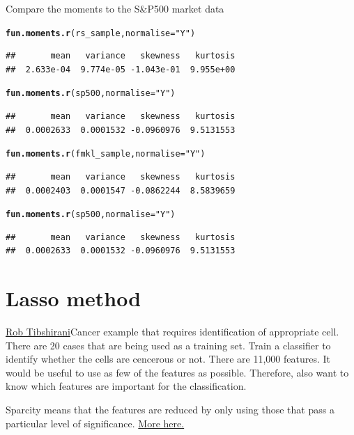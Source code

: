 \documentclass[12pt, a4paper, oneside]{article}\usepackage[]{graphicx}\usepackage[]{color}
\makeatletter
\newcommand{\hlstr}[1]{\textcolor[rgb]{0.192,0.494,0.8}{#1}}%
\newcommand{\hlstd}[1]{\textcolor[rgb]{0.345,0.345,0.345}{#1}}%
\newcommand{\hlkwc}[1]{\textcolor[rgb]{0.333,0.667,0.333}{#1}}%
\newcommand{\hlkwd}[1]{\textcolor[rgb]{0.737,0.353,0.396}{\textbf{#1}}}%
\newenvironment{kframe}{%
 \def\at@end@of@kframe{}%
 \ifinner\ifhmode%
  \def\at@end@of@kframe{\end{minipage}}%
  \begin{minipage}{\columnwidth}%
 \fi\fi%
 \def\FrameCommand##1{\hskip\@totalleftmargin \hskip-\fboxsep
 \colorbox{shadecolor}{##1}\hskip-\fboxsep
     \hskip-\linewidth \hskip-\@totalleftmargin \hskip\columnwidth}%
 \MakeFramed {\advance\hsize-\width
   \@totalleftmargin\z@ \linewidth\hsize
   \@setminipage}}%
 {\par\unskip\endMakeFramed%
 \at@end@of@kframe}
\newenvironment{knitrout}{}{} %
\makeatother
\begin{document}
Compare the moments to the S\&P500 market data
\begin{knitrout}
\color{fgcolor}\begin{kframe}
\begin{alltt}
\hlkwd{fun.moments.r}\hlstd{(rs_sample,} \hlkwc{normalise} \hlstd{=} \hlstr{"Y"}\hlstd{)}
\end{alltt}
\begin{verbatim}
##       mean   variance   skewness   kurtosis 
##  2.633e-04  9.774e-05 -1.043e-01  9.955e+00
\end{verbatim}
\begin{alltt}
\hlkwd{fun.moments.r}\hlstd{(sp500,} \hlkwc{normalise} \hlstd{=} \hlstr{"Y"}\hlstd{)}
\end{alltt}
\begin{verbatim}
##       mean   variance   skewness   kurtosis 
##  0.0002633  0.0001532 -0.0960976  9.5131553
\end{verbatim}
\begin{alltt}
\hlkwd{fun.moments.r}\hlstd{(fmkl_sample,} \hlkwc{normalise} \hlstd{=} \hlstr{"Y"}\hlstd{)}
\end{alltt}
\begin{verbatim}
##       mean   variance   skewness   kurtosis 
##  0.0002403  0.0001547 -0.0862244  8.5839659
\end{verbatim}
\begin{alltt}
\hlkwd{fun.moments.r}\hlstd{(sp500,} \hlkwc{normalise} \hlstd{=} \hlstr{"Y"}\hlstd{)}
\end{alltt}
\begin{verbatim}
##       mean   variance   skewness   kurtosis 
##  0.0002633  0.0001532 -0.0960976  9.5131553
\end{verbatim}
\end{kframe}
\end{knitrout}

\section{Lasso method}
\href{http://www.mathtube.org/lecture/video/lasso-brief-review-and-new-significance-test#.U1aODV1sp94.twitter}{Rob Tibshirani}Cancer example that requires identification of appropriate cell. There are 20 cases that are being used as a training set.  Train a classifier to identify whether the cells are cencerous or not.  There are 11,000 features. It would be useful to use as few of the features as possible. Therefore, also want to know which features are important for the classification. 

Sparcity means that the features are reduced by only using those that pass a particular level of significance.  \href{http://statweb.stanford.edu/~tibs/lasso.html}{More here.}
\end{document}
